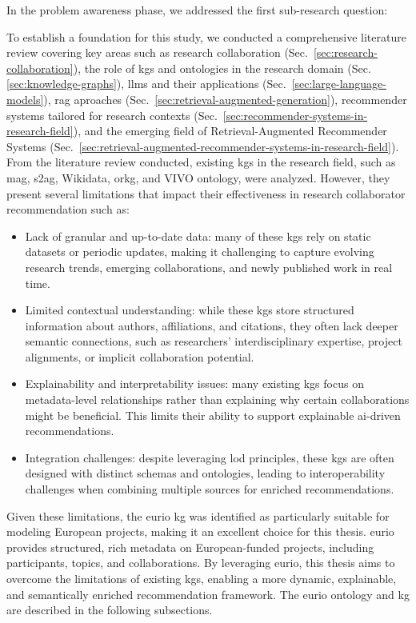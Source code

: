 In the problem awareness phase, we addressed the first sub-research question:
\begin{center}
    \rqOne
\end{center}
To establish a foundation for this study, we conducted a comprehensive literature review covering key areas such as research collaboration (Sec.~\ref{sec:research-collaboration}), the role of \glspl{kg} and ontologies in the research domain (Sec.\ref{sec:knowledge-graphs}), \glspl{llm} and their applications (Sec.~\ref{sec:large-language-models}), \gls{rag} aproaches (Sec.~\ref{sec:retrieval-augmented-generation}), recommender systems tailored for research contexts (Sec.~\ref{sec:recommender-systems-in-research-field}), and the emerging field of Retrieval-Augmented Recommender Systems (Sec.~\ref{sec:retrieval-augmented-recommender-systems-in-research-field}).
From the literature review conducted, existing \glspl{kg} in the research field, such as \gls{mag}, \gls{s2ag}, Wikidata, \gls{orkg}, and VIVO ontology, were analyzed.
However, they present several limitations that impact their effectiveness in research collaborator recommendation such as:
\begin{itemize}
    \item Lack of granular and up-to-date data: many of these \glspl{kg} rely on static datasets or periodic updates, making it challenging to capture evolving research trends, emerging collaborations, and newly published work in real time.
    \item Limited contextual understanding: while these \glspl{kg} store structured information about authors, affiliations, and citations, they often lack deeper semantic connections, such as researchers' interdisciplinary expertise, project alignments, or implicit collaboration potential.
    \item Explainability and interpretability issues: many existing \glspl{kg} focus on metadata-level relationships rather than explaining why certain collaborations might be beneficial. This limits their ability to support explainable \gls{ai}-driven recommendations.
    \item Integration challenges: despite leveraging \gls{lod} principles, these \glspl{kg} are often designed with distinct schemas and ontologies, leading to interoperability challenges when combining multiple sources for enriched recommendations.
\end{itemize}

Given these limitations, the \gls{eurio} \gls{kg} was identified as particularly suitable for modeling European projects, making it an excellent choice for this thesis.
\gls{eurio} provides structured, rich metadata on European-funded projects, including participants, topics, and collaborations.
By leveraging \gls{eurio}, this thesis aims to overcome the limitations of existing \glspl{kg}, enabling a more dynamic, explainable, and semantically enriched recommendation framework.
The \gls{eurio} ontology and \gls{kg} are described in the following subsections.

